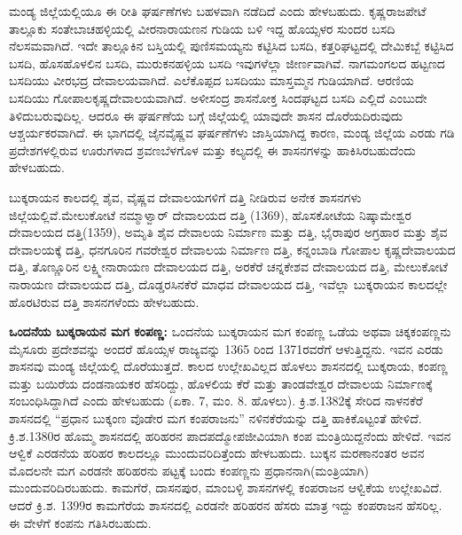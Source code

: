 ಮಂಡ್ಯ ಜಿಲ್ಲೆಯಲ್ಲಿಯೂ ಈ ರೀತಿ ಘರ್ಷಣೆಗಳು ಬಹಳವಾಗಿ ನಡೆದಿದೆ ಎಂದು ಹೇಳಬಹುದು. ಕೃಷ್ಣರಾಜಪೇಟೆ ತಾಲ್ಲೂಕು ಸಂತೇಬಾಚಹಳ್ಳಿಯಲ್ಲಿ ವೀರನಾರಾಯಣನ ಗುಡಿಯ ಬಳಿ ಇದ್ದ ಹೊಯ್ಸಳರ ಸುಂದರ ಬಸದಿ ನೆಲಸಮವಾಗಿದೆ. ಇದೇ ತಾಲ್ಲೂಕಿನ ಬಸ್ತಿಯಲ್ಲಿ ಪುಣಿಸಮಯ್ಯನು ಕಟ್ಟಿಸಿದ ಬಸದಿ, ಕತ್ತರಿಘಟ್ಟದಲ್ಲಿ ದೇಮಿಕಬ್ಬೆ ಕಟ್ಟಿಸಿದ ಬಸದಿ, ಹೊಸಹೊಳಲಿನ ಬಸದಿ, ಮುರುಕನಹಳ್ಳಿಯ ಬಸದಿ ಇವುಗಳೆಲ್ಲಾ ಜೀರ್ಣವಾಗಿವೆ. ನಾಗಮಂಗಲದ ಹಟ್ಟಣದ ಬಸದಿಯು ವೀರಭದ್ರ ದೇವಾಲಯವಾಗಿದೆ. ಎಲೆಕೊಪ್ಪದ ಬಸದಿಯು ಮಾಸ್ತಮ್ಮನ ಗುಡಿಯಾಗಿದೆ. ಆರಣಿಯ ಬಸದಿಯು ಗೋಪಾಲಕೃಷ್ಣ\-ದೇವಾಲಯವಾಗಿದೆ. ಅಳೀಸಂದ್ರ ಶಾಸನೋಕ್ತ ಸಿಂದಘಟ್ಟದ ಬಸದಿ ಎಲ್ಲಿದೆ ಎಂಬುದೇ ತಿಳಿದುಬರುವುದಿಲ್ಲ. ಆದರೂ ಈ ಘರ್ಷಣೆಯ ಬಗ್ಗೆ ಜಿಲ್ಲೆಯಲ್ಲಿ ಯಾವುದೇ ಶಾಸನ ದೊರೆಯದಿರುವುದು ಆಶ್ಚರ್ಯಕರವಾಗಿದೆ. ಈ ಭಾಗದಲ್ಲಿ ಜೈನವೈಷ್ಣವ ಘರ್ಷಣೆಗಳು ಜಾಸ್ತಿಯಾಗಿದ್ದ ಕಾರಣ, ಮಂಡ್ಯ ಜಿಲ್ಲೆಯ ಎರಡು ಗಡಿ ಪ್ರದೇಶಗಳಲ್ಲಿರುವ ಊರುಗಳಾದ ಶ್ರವಣಬೆಳಗೊಳ ಮತ್ತು ಕಲ್ಯದಲ್ಲಿ ಈ ಶಾಸನಗಳನ್ನು ಹಾಕಿಸಿರಬಹುದೆಂದು ಹೇಳಬಹುದು.

ಬುಕ್ಕರಾಯನ ಕಾಲದಲ್ಲಿ ಶೈವ, ವೈಷ್ಣವ ದೇವಾಲಯಗಳಿಗೆ ದತ್ತಿ ನೀಡಿರುವ ಅನೇಕ ಶಾಸನಗಳು ಜಿಲ್ಲೆಯಲ್ಲಿವೆ.\break ಮೇಲುಕೋಟೆ ನಮ್ಮಾಳ್ವಾರ್​ ದೇವಾಲಯದ ದತ್ತಿ (1369), ಹೊಸಕೋಟೆಯ ನಿಷ್ಕಾಮೇಶ್ವರ ದೇವಾಲಯದ ದತ್ತಿ(1359), ಅಮೃತಿ ಶೈವ ದೇವಾಲಯ ನಿರ್ಮಾಣ ಮತ್ತು ದತ್ತಿ, ಭೈರಾಪುರ ಅಗ್ರಹಾರ ಮತ್ತು ಶೈವ ದೇವಾಲಯಕ್ಕೆ ದತ್ತಿ, ಧನಗೂರಿನ ಗವರೇಶ್ವರ ದೇವಾಲಯ ನಿರ್ಮಾಣ ದತ್ತಿ, ಕನ್ನಂಬಾಡಿ ಗೋಪಾಲ ಕೃಷ್ಣದೇವಾಲಯದ ದತ್ತಿ, ತೊಣ್ಣೂರಿನ ಲಕ್ಷ್ಮೀನಾರಾಯಣ ದೇವಾಲಯದ ದತ್ತಿ, ಅರಕೆರೆ ಚನ್ನಕೇಶವ ದೇವಾಲಯದ ದತ್ತಿ, ಮೇಲುಕೋಟೆ ನಾರಾಯಣ ದೇವಾಲಯದ ದತ್ತಿ, ದೊಡ್ಡರಸಿನಕೆರೆ ಮಾಧವ ದೇವಾಲಯದ ದತ್ತಿ, ಇವೆಲ್ಲಾ ಬುಕ್ಕರಾಯನ ಕಾಲದಲ್ಲೇ ಹೊರಟಿರುವ ದತ್ತಿ ಶಾಸನಗಳೆಂದು ಹೇಳಬಹುದು.

\textbf{ ಒಂದನೆಯ ಬುಕ್ಕರಾಯನ ಮಗ ಕಂಪಣ್ಣ:} ಒಂದನೆಯ ಬುಕ್ಕರಾಯನ ಮಗ ಕಂಪಣ್ಣ ಒಡೆಯ ಅಥವಾ ಚಿಕ್ಕಕಂಪಣ್ಣನು ಮೈಸೂರು ಪ್ರದೇಶವನ್ನು ಅಂದರೆ ಹೊಯ್ಸಳ ರಾಜ್ಯವನ್ನು 1365 ರಿಂದ 1371ರವರೆಗೆ ಆಳುತ್ತಿದ್ದನು. ಇವನ ಎರಡು ಶಾಸನವು ಮಂಡ್ಯ ಜಿಲ್ಲೆಯಲ್ಲಿ ದೊರೆಯುತ್ತದೆ. ಕಾಲದ ಉಲ್ಲೇಖವಿಲ್ಲದ ಹೊಳಲು ಶಾಸನದಲ್ಲಿ ಬುಕ್ಕರಾಯ, ಕಂಪಣ್ಣ ಮತ್ತು ಬಯಿರೆಯ ದಂಡನಾಯಕರ ಹೆಸರಿದ್ದು, ಹೊಳಲಿಯ ಕೆರೆ ಮತ್ತು ತಾಂಡವೇಶ್ವರ ದೇವಾಲಯ ನಿರ್ಮಾಣಕ್ಕೆ ಸಂಬಂಧಿಸಿದ್ದಾಗಿದೆ ಎಂದು ಹೇಳಬಹುದು (ಏಕಾ. 7, ಮಂ. 8. ಹೊಳಲು). ಕ್ರಿ.ಶ.1382ಕ್ಕೆ ಸೇರಿದ ನಾಳನಕೆರೆ ಶಾಸನದಲ್ಲಿ “ಪ್ರಧಾನ ಬುಕ್ಕಂಣ ವೊಡೇರ ಮಗ ಕಂಪರಾಜನು” ನಳಿನಕೆರೆಯನ್ನು ದತ್ತಿ ಹಾಕಿಕೊಟ್ಟಂತೆ ಹೇಳಿದೆ. ಕ್ರಿ.ಶ.1380ರ ಹೊಮ್ಮ ಶಾಸನದಲ್ಲಿ ಹರಿಹರನ ಪಾದಪದ್ಮೋಪಜೀವಿಯಾಗಿ ಕಂಪ ಮಂತ್ರಿಯಿದ್ದನೆಂದು ಹೇಳಿದೆ. ಇವನ ಆಳ್ವಿಕೆ ಎರಡನೆಯ ಹರಿಹರ ಕಾಲದಲ್ಲೂ ಮುಂದುವರಿದಿತ್ತೆಂದು ಹೇಳಬಹುದು. ಬುಕ್ಕನ ಮರಣಾನಂತರ ಅವನ ಮೊದಲನೇ ಮಗ ಎರಡನೇ ಹರಿಹರನು ಪಟ್ಟಕ್ಕೆ ಬಂದು ಕಂಪಣ್ಣನು ಪ್ರಧಾನನಾಗಿ(ಮಂತ್ರಿಯಾಗಿ) ಮುಂದುವರಿದಿರಬಹುದು. ಕಾಮಗೆರೆ, ದಾಸನಪುರ, ಮಾಂಬಳ್ಳಿ ಶಾಸನಗಳಲ್ಲಿ ಕಂಪರಾಜನ ಆಳ್ವಿಕೆಯ ಉಲ್ಲೇಖವಿದೆ. ಆದರೆ ಕ್ರಿ.ಶ. 1399ರ ಕಾಮಗೆರೆಯ ಶಾಸನದಲ್ಲಿ ಎರಡನೇ ಹರಿಹರನ ಹೆಸರು ಮಾತ್ರ ಇದ್ದು ಕಂಪರಾಜನ ಹೆಸರಿಲ್ಲ. ಈ ವೇಳೆಗೆ ಕಂಪನು ಗತಿಸಿರಬಹುದು.

